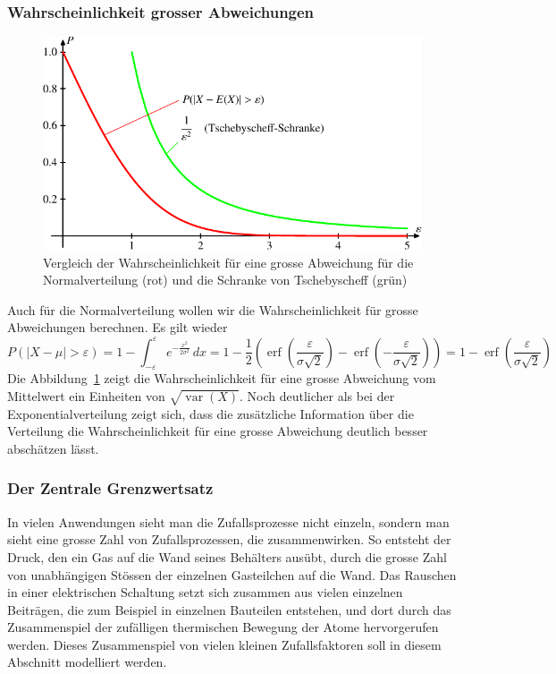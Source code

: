 \subsubsection{Wahrscheinlichkeit grosser Abweichungen}
\begin{figure}
\begin{center}
\includegraphics{images/norm-1.pdf}
\end{center}
\caption{Vergleich der Wahrscheinlichkeit für eine grosse Abweichung
für die Normalverteilung (rot) und die Schranke von Tschebyscheff (grün)
\label{abweichung-normalverteilung}}
\end{figure}

Auch für die Normalverteilung wollen wir die Wahrscheinlichkeit
für grosse Abweichungen berechnen.
Es gilt wieder
\[
P(|X-\mu|>\varepsilon)
=1-\int_{-\varepsilon}^{\varepsilon}e^{-\frac{x^2}{2\sigma^2}}\,dx
=
1-{\textstyle\frac12}(\operatorname{erf}({\textstyle\frac{\varepsilon}{\sigma\sqrt{2}}})-\operatorname{erf}({\textstyle-\frac{\varepsilon}{\sigma\sqrt{2}}}))
=
1-\operatorname{erf}({\textstyle\frac{\varepsilon}{\sigma\sqrt{2}}})
\]
Die Abbildung~\ref{abweichung-normalverteilung} zeigt die Wahrscheinlichkeit
für eine grosse Abweichung vom Mittelwert ein Einheiten
von $\sqrt{\operatorname{var}(X)}$.
Noch deutlicher als bei der
Exponentialverteilung zeigt sich, dass die zusätzliche Information
über die Verteilung die Wahrscheinlichkeit für eine grosse
Abweichung deutlich besser abschätzen lässt.

\subsubsection{Der Zentrale Grenzwertsatz}
\label{zentraler-grenzwertsatz}
In vielen Anwendungen sieht man die Zufallsprozesse nicht einzeln, sondern
man sieht eine grosse Zahl von Zufallsprozessen, die zusammenwirken.
So entsteht der Druck, den ein Gas auf die Wand seines Behälters ausübt,
durch die grosse Zahl von unabhängigen Stössen der einzelnen Gasteilchen
auf die Wand.
Das Rauschen in einer elektrischen Schaltung setzt sich
zusammen aus vielen einzelnen Beiträgen, die zum Beispiel in einzelnen
Bauteilen entstehen, und dort durch das Zusammenspiel der zufälligen
thermischen Bewegung der Atome hervorgerufen werden.
Dieses Zusammenspiel von vielen kleinen Zufallsfaktoren soll in diesem
Abschnitt modelliert werden.

